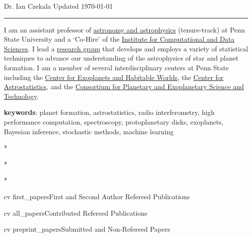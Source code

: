 \documentclass[10pt]{article}
\begin{document}
 \selectfont

{\huge \textcolor{myblue1}{Dr. Ian Czekala} } {\small \hfill Updated \today}

\rule{\textwidth}{1pt}



\vspace{12pt}

I am an assistant professor of \href{https://science.psu.edu/astro}{astronomy and astrophysics} (tenure-track) at Penn State University and a `Co-Hire' of the \href{https://www.icds.psu.edu/}{Institute for Computational and Data Sciences}. I lead a \href{https://iancze.github.io/}{research group} that develops and employs a variety of statistical techniques to advance our understanding of the astrophysics of star and planet formation. I am a member of several interdisciplinary centers at Penn State including the \href{https://exoplanets.psu.edu/}{Center for Exoplanets and Habitable Worlds}, the \href{https://sites.psu.edu/astrostatistics/}{Center for Astrostatistics}, and the \href{https://cpest.psu.edu/}{Consortium for Planetary and Exoplanetary Science and Technology}.

\textbf{keywords}: planet formation, astrostatistics, radio interferometry, high performance computation, spectroscopy, protoplanetary disks, exoplanets, Bayesian inference, stochastic methods, machine learning











\nocite{first}{*}

\nocite{all}{*}

\nocite{preprint}{*}

{cv}
{first_papers}{First and Second Author Refereed Publications}

{cv}
{all_papers}{Contributed Refereed Publications}

{cv}
{preprint_papers}{Submitted and Non-Refereed Papers}






















\end{document}
